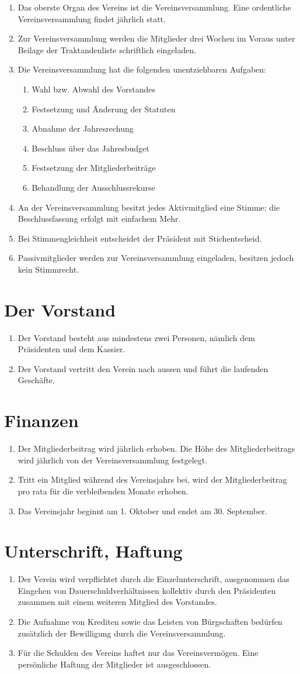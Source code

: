 \documentclass[10pt,a4paper,parskip,fleqn]{scrartcl}
\newcommand{\ol}{\begin{enumerate}[itemsep=-0.2em,topsep=-0.2em]}
\newcommand{\lo}{\end{enumerate}}
\newcommand{\li}{\item}
\begin{document}
\ol
	\li Das oberste Organ des Vereins ist die Vereinsversammlung. Eine ordentliche
	Vereinsversammlung findet jährlich statt.
	\li Zur Vereinsversammlung werden die Mitglieder drei Wochen im Voraus
	unter Beilage der Traktandenliste schriftlich eingeladen.
	\li Die Vereinsversammlung hat die folgenden unentziehbaren Aufgaben:
		\ol
			\li Wahl bzw. Abwahl des Vorstandes
			\li Festsetzung und Änderung der Statuten
			\li Abnahme der Jahresrechung
			\li Beschluss über das Jahresbudget
			\li Festsetzung der Mitgliederbeiträge
			\li Behandlung der Ausschlussrekurse
		\lo
	\li An der Vereinsversammlung besitzt jedes Aktivmitglied eine Stimme; die
	Beschlussfassung erfolgt mit einfachem Mehr.
	\li Bei Stimmengleichheit entscheidet der Präsident mit Stichentscheid.
	\li Passivmitglieder werden zur Vereinsversammlung eingeladen, besitzen jedoch
	kein Stimmrecht.
\lo


\section{Der Vorstand}

\ol
	\li Der Vorstand besteht aus mindestens zwei Personen, nämlich dem Präsidenten
	und dem Kassier.
	\li Der Vorstand vertritt den Verein nach aussen und führt die laufenden
	Geschäfte.
\lo


\section{Finanzen}

\ol
	\li Der Mitgliederbeitrag wird jährlich erhoben. Die Höhe des
	Mitgliederbeitrags wird jährlich von der Vereinsversammlung festgelegt.
	\li Tritt ein Mitglied während des Vereinsjahrs bei, wird der
	Mitgliederbeitrag pro rata für die verbleibenden Monate erhoben.
	\li Das Vereinsjahr beginnt am 1. Oktober und endet am 30. September.
\lo


\section{Unterschrift, Haftung}

\ol
	\li Der Verein wird verpflichtet durch die Einzelunterschrift, ausgenommen das
	Eingehen von Dauerschuldverhältnissen kollektiv durch den Präsidenten zusammen
	mit einem weiteren Mitglied des Vorstandes.
	\li Die Aufnahme von Krediten sowie das Leisten von Bürgschaften bedürfen
	zusätzlich der Bewilligung durch die Vereinsversammlung.
	\li Für die Schulden des Vereins haftet nur das Vereinsvermögen. Eine
	persönliche Haftung der Mitglieder ist ausgeschlossen.
\lo
\end{document}
